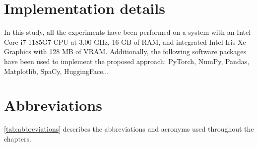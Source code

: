 \documentclass[a4paper,12pt, openany]{book}  %
\begin{document}
\clearpage
\begin{appendices}
    \chapter{Implementation details}
    \label{appendix:A}

In this study, all the experiments have been performed on a system with an Intel Core i7-1185G7 CPU at 3.00 GHz, 16 GB of RAM, and integrated Intel Iris Xe Graphics with 128 MB of VRAM. Additionally, the following software packages have been used to implement the proposed approach: PyTorch, NumPy, Pandas, Matplotlib, SpaCy, HuggingFace...

\chapter{Abbreviations}
\label{appendix:B}
\autoref{tab:abbreviations} describes the abbreviations and acronyms used throughout the chapters.



\end{appendices}
\end{document}
